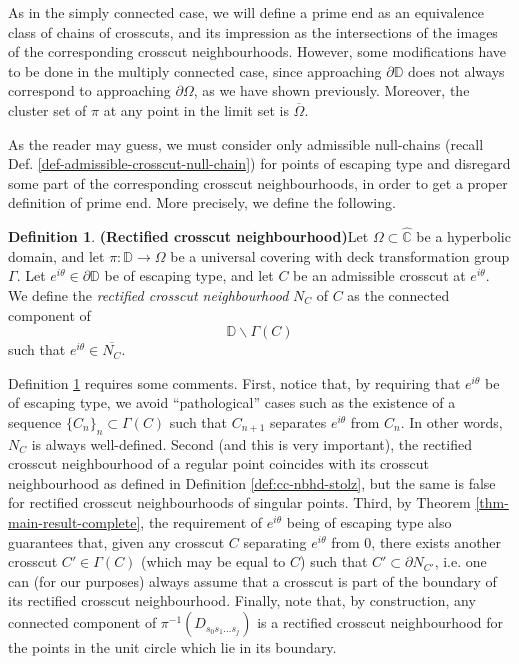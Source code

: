 \documentclass[11pt,a4paper,reqno]{amsart}
\theoremstyle{plain}
\theoremstyle{definition}
\newtheorem{defi}[thm]{Definition}
\theoremstyle{plain}
\def\Chat{\widehat{\mathbb{C}}}
\def\DD{\mathbb{D}}
\begin{document}
As in the simply connected case, we will define a prime end as an equivalence class of chains of crosscuts, and its impression as the intersections of the images of the corresponding crosscut neighbourhoods. However, some modifications have to be done in the multiply connected case, since approaching $ \partial \mathbb{D} $ does not always correspond to approaching $ \partial \Omega$, as we have shown previously. Moreover, the cluster set of $ \pi  $ at any point in the limit set is $ \overline{\Omega} $. 

As the reader may guess, we must consider only admissible null-chains (recall Def. \ref{def-admissible-crosscut-null-chain}) for points of escaping type and disregard some part of the corresponding crosscut neighbourhoods, in order to get a proper definition of prime end. More precisely, we define the following.
\begin{defi}{\bf (Rectified crosscut neighbourhood)}\label{def-true-crosscut-nhd}
Let $\Omega\subset\Chat$ be a hyperbolic domain, and let $\pi\colon\DD\to\Omega$ be a universal covering with deck transformation group $\Gamma$. Let $ e^{i\theta}\in\partial\mathbb{D} $ be of escaping type, and let $ C $ be an admissible crosscut at $ e^{i\theta }$. We define the {\em rectified crosscut neighbourhood} $ N_C $ of $ C $ as the connected component of \[\mathbb{D}\smallsetminus \Gamma(C)\] such that $  e^{i\theta}\in\overline{N_C}$.
\end{defi}

Definition \ref{def-true-crosscut-nhd} requires some comments. First, notice that, by requiring that $e^{i\theta}$ be of escaping type, we avoid ``pathological'' cases such as the existence of a sequence $\{C_n\}_n\subset \Gamma(C)$ such that $C_{n+1}$ separates $e^{i\theta}$ from $C_n$. In other words, $N_C$ is always well-defined. Second (and this is very important), the rectified crosscut neighbourhood of a regular point coincides with its crosscut neighbourhood as defined in Definition \ref{def:cc-nbhd-stolz}, but the same is false for rectified crosscut neighbourhoods of singular points. Third, by Theorem \ref{thm-main-result-complete}, the requirement of $e^{i\theta}$ being of escaping type also guarantees that, given any crosscut $C$ separating $e^{i\theta}$ from $0$, there exists another crosscut $C'\in\Gamma(C)$ (which may be equal to $C$) such that $C'\subset \partial N_{C'}$, i.e. one can (for our purposes) always assume that a crosscut is part of the boundary of its rectified crosscut neighbourhood. Finally, note that, by construction, any connected component of $\pi^{-1}(D_{s_0s_1\dots s_j})$ is a rectified crosscut neighbourhood for the points in the unit circle which lie in its boundary. 
\end{document}
